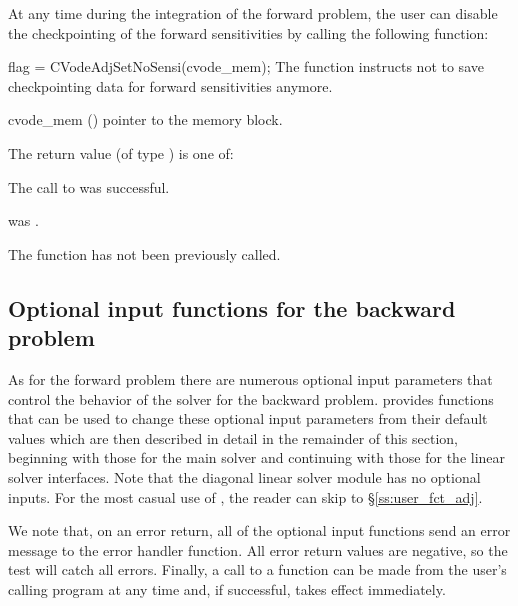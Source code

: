 At any time during the integration of the forward problem, the user can disable
the checkpointing of the forward sensitivities by calling the following function:

{
  flag = CVodeAdjSetNoSensi(cvode\_mem);
}
{
  The function  instructs  not
  to save checkpointing data for forward sensitivities anymore.
}
{
  \begin{args}
  \item[cvode\_mem] ()
    pointer to the {\cvodes}  memory block.
  \end{args}
}
{
  The return value  (of type ) is one of:
  \begin{args}
  \item[\Id{CV\_SUCCESS}]
    The call to  was successful.
  \item[\Id{CV\_MEM\_NULL}]
     was .
  \item[\Id{CV\_NO\_ADJ}]
    The function  has not been previously called.
  \end{args}
}
{}


\subsection{Optional input functions for the backward problem}
\label{ss:optional_input_b}

As for the forward problem there are numerous optional input parameters that
control the behavior of the {\cvodes} solver for the backward problem. {\cvodes}
provides functions that can be used to change these optional input parameters
from their default values which are then described in detail in the remainder of
this section, beginning with those for the main {\cvodes} solver and continuing
with those for the linear solver interfaces. Note that the diagonal linear
solver module has no optional inputs. For the most casual use of {\cvodes}, the
reader can skip to \S\ref{ss:user_fct_adj}.

We note that, on an error return, all of the optional input functions send an
error message to the error handler function.
All error return values are negative, so the test  will catch all
errors. Finally, a call to a  function can be made from the
user's calling program at any time and, if successful, takes effect immediately.

